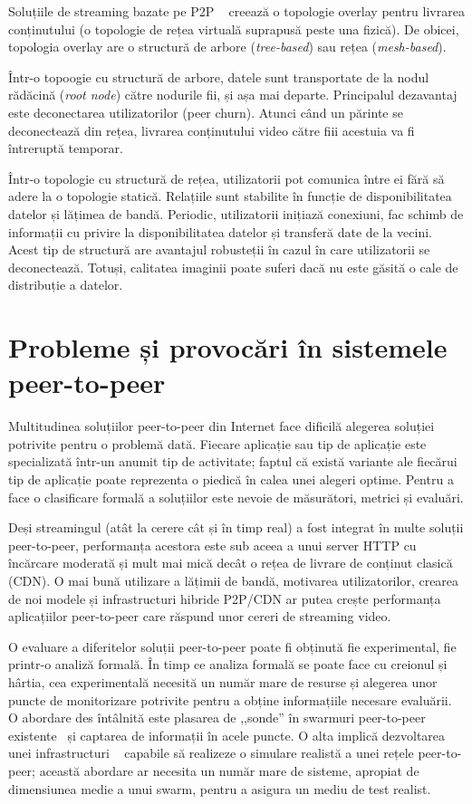 Soluțiile de streaming bazate pe P2P ~\cite{p2p-streaming-survey} creează o
topologie overlay pentru livrarea conținutului (o topologie de rețea virtuală
suprapusă peste una fizică). De obicei, topologia overlay are o structură
de arbore (\textit{tree-based}) sau rețea (\textit{mesh-based}).

Într-o topoogie cu structură de arbore, datele sunt transportate de la nodul
rădăcină (\textit{root node}) către nodurile fii, și așa mai departe.
Principalul dezavantaj este deconectarea utilizatorilor (peer churn). Atunci
când un părinte se deconectează din rețea, livrarea conținutului video către
fiii acestuia va fi întreruptă temporar.

Într-o topologie cu structură de rețea, utilizatorii pot comunica între ei
fără să adere la o topologie statică. Relațiile sunt stabilite în funcție de
disponibilitatea datelor și lățimea de bandă. Periodic, utilizatorii inițiază
conexiuni, fac schimb de informații cu privire la disponibilitatea datelor și
transferă date de la vecini. Acest tip de structură are avantajul robusteții
în cazul în care utilizatorii se deconectează. Totuși, calitatea imaginii poate
suferi dacă nu este găsită o cale de distribuție a datelor.

\section{Probleme și provocări în sistemele peer-to-peer}
\label{sec:p2p-systems:issues}

Multitudinea soluțiilor peer-to-peer din Internet face dificilă alegerea
soluției potrivite pentru o problemă dată. Fiecare aplicație sau tip de
aplicație este specializată într-un anumit tip de activitate; faptul că
există variante ale fiecărui tip de aplicație poate reprezenta o piedică în
calea unei alegeri optime. Pentru a face o clasificare formală a soluțiilor
este nevoie de măsurători, metrici și evaluări.

Deși streamingul (atât la cerere cât și în timp real) a fost integrat în multe
soluții peer-to-peer, performanța acestora este sub aceea a unui server HTTP
cu încărcare moderată și mult mai mică decât o rețea de livrare de conținut
clasică (CDN). O mai bună utilizare a lățimii de bandă, motivarea
utilizatorilor, crearea de noi modele și infrastructuri hibride P2P/CDN ar putea
crește performanța aplicațiilor peer-to-peer care răspund unor cereri de
streaming video.

O evaluare a diferitelor soluții peer-to-peer poate fi obținută fie
experimental, fie printr-o analiză formală. În timp ce analiza formală se
poate face cu creionul și hârtia, cea experimentală necesită un număr mare de
resurse și alegerea unor puncte de monitorizare potrivite pentru a obține
informațiile necesare evaluării. O abordare des întâlnită este plasarea de
,,sonde'' în swarmuri peer-to-peer existente~\cite{corr-overlay} și captarea
de informații în acele puncte. O alta implică dezvoltarea unei infrastructuri
~\cite{bt-vi} capabile să realizeze o simulare realistă a unei rețele
peer-to-peer; această abordare ar necesita un număr mare de sisteme, apropiat
de dimensiunea medie a unui swarm, pentru a asigura un mediu de test realist.

